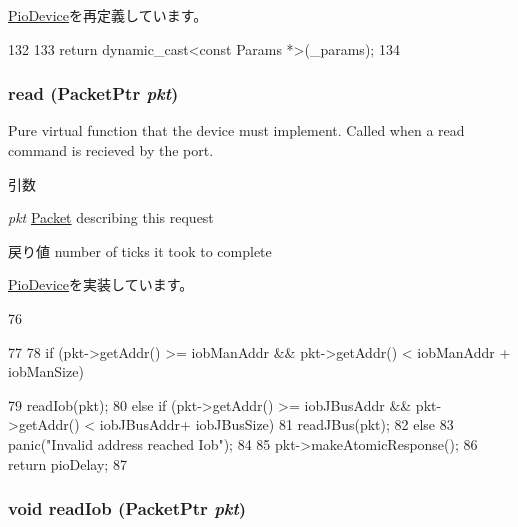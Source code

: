 \hyperlink{classPioDevice_acd3c3feb78ae7a8f88fe0f110a718dff}{PioDevice}を再定義しています。


\begin{DoxyCode}
132     {
133         return dynamic_cast<const Params *>(_params);
134     }
\end{DoxyCode}
\hypertarget{classIob_a613ec7d5e1ec64f8d21fec78ae8e568e}{
\subsubsection[{read}]{ read ({\bf PacketPtr} {\em pkt})}}
\label{classIob_a613ec7d5e1ec64f8d21fec78ae8e568e}
Pure virtual function that the device must implement. Called when a read command is recieved by the port. 
\begin{DoxyParams}{引数}
\item[{\em pkt}]\hyperlink{classPacket}{Packet} describing this request \end{DoxyParams}
\begin{DoxyReturn}{戻り値}
number of ticks it took to complete 
\end{DoxyReturn}


\hyperlink{classPioDevice_a842312590432036092c422c87a442358}{PioDevice}を実装しています。


\begin{DoxyCode}
76 {
77 
78     if (pkt->getAddr() >= iobManAddr && pkt->getAddr() < iobManAddr + iobManSize)
      
79         readIob(pkt);
80     else if (pkt->getAddr() >= iobJBusAddr && pkt->getAddr() < iobJBusAddr+
      iobJBusSize)
81         readJBus(pkt);
82     else
83         panic("Invalid address reached Iob\n");
84 
85     pkt->makeAtomicResponse();
86     return pioDelay;
87 }
\end{DoxyCode}
\hypertarget{classIob_ab4cf9411b48d0baf8e0788b840c8256a}{
\subsubsection[{readIob}]{\setlength{\rightskip}{0pt plus 5cm}void readIob ({\bf PacketPtr} {\em pkt})}}
\label{classIob_ab4cf9411b48d0baf8e0788b840c8256a}



